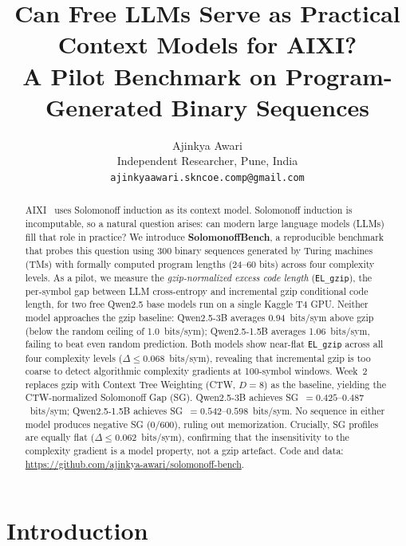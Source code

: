 \documentclass{article}
\title{Can Free LLMs Serve as Practical Context Models for AIXI?\\
A Pilot Benchmark on Program-Generated Binary Sequences}
\author{%
  Ajinkya Awari \\
  Independent Researcher, Pune, India \\
  \texttt{ajinkyaawari.skncoe.comp@gmail.com}
}
\begin{document}
\maketitle

\begin{abstract}

AIXI~\citep{hutter2000aixi} uses Solomonoff induction as its context model.
Solomonoff induction is incomputable, so a natural question arises: can modern
large language models (LLMs) fill that role in practice?
We introduce \textbf{SolomonoffBench}, a reproducible benchmark that probes
this question using 300 binary sequences generated by Turing machines (TMs)
with formally computed program lengths (24--60 bits) across four complexity
levels. As a pilot, we measure the \emph{gzip-normalized excess code length}
(\texttt{EL\_gzip}), the per-symbol gap between LLM cross-entropy and
incremental gzip conditional code length, for two free Qwen2.5 base models
run on a single Kaggle T4 GPU.
Neither model approaches the gzip baseline: Qwen2.5-3B averages
0.94~bits/sym above gzip (below the random ceiling of 1.0~bits/sym);
Qwen2.5-1.5B averages 1.06~bits/sym, failing to beat even random prediction.
Both models show near-flat \texttt{EL\_gzip} across all four complexity
levels ($\Delta \leq 0.068$~bits/sym), revealing that incremental gzip is too
coarse to detect algorithmic complexity gradients at 100-symbol windows.
Week~2 replaces gzip with Context Tree Weighting (CTW, $D{=}8$) as the
baseline, yielding the CTW-normalized Solomonoff Gap (SG).
Qwen2.5-3B achieves SG~$= 0.425$--$0.487$~bits/sym; Qwen2.5-1.5B achieves
SG~$= 0.542$--$0.598$~bits/sym.
No sequence in either model produces negative SG (0/600), ruling out
memorization.
Crucially, SG profiles are equally flat ($\Delta \leq 0.062$~bits/sym),
confirming that the insensitivity to the complexity gradient is a model
property, not a gzip artefact.
Code and data: \url{https://github.com/ajinkya-awari/solomonoff-bench}.

\end{abstract}

\section{Introduction}
\end{document}
